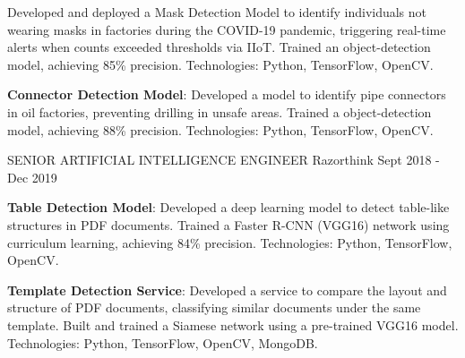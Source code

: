 \begin{cventries}
{\begin{cvitems}
{        Developed and deployed a Mask Detection Model to 
        identify individuals not wearing masks in factories during the COVID-19 pandemic, triggering 
        real-time alerts when counts exceeded thresholds via IIoT. \newline
        Trained an  object-detection model, 
        achieving 85\% precision. \newline Technologies: Python, TensorFlow, OpenCV.}        
        \item{\textbf{Connector Detection Model}: \newline Developed a model to identify 
        pipe connectors in oil factories, preventing drilling in unsafe areas. \newline
        Trained a  object-detection model, achieving 88\% precision. \newline
        Technologies: Python, TensorFlow, OpenCV.}
	\end{cvitems}
    }
\vspace{2em} %
  \cventry
    {SENIOR ARTIFICIAL INTELLIGENCE ENGINEER} %
    {Razorthink} %
    {} %
    {Sept 2018 - Dec 2019} %
    {
      \begin{cvitems} %
        \item{\textbf{Table Detection Model}: Developed a deep learning model to 
        detect table-like structures in PDF documents. \newline Trained a Faster 
        R-CNN (VGG16) network using curriculum learning, 
        achieving 84\% precision. \newline Technologies: Python, TensorFlow, OpenCV.}      
        \item{\textbf{Template Detection Service}: Developed a service to compare the 
        layout and structure of PDF documents, classifying similar documents under 
        the same template. \newline Built and trained a Siamese network using a pre-trained 
        VGG16 model. \newline Technologies: Python, TensorFlow, OpenCV, MongoDB.}       
	\end{cvitems}
    }

\end{cventries}
